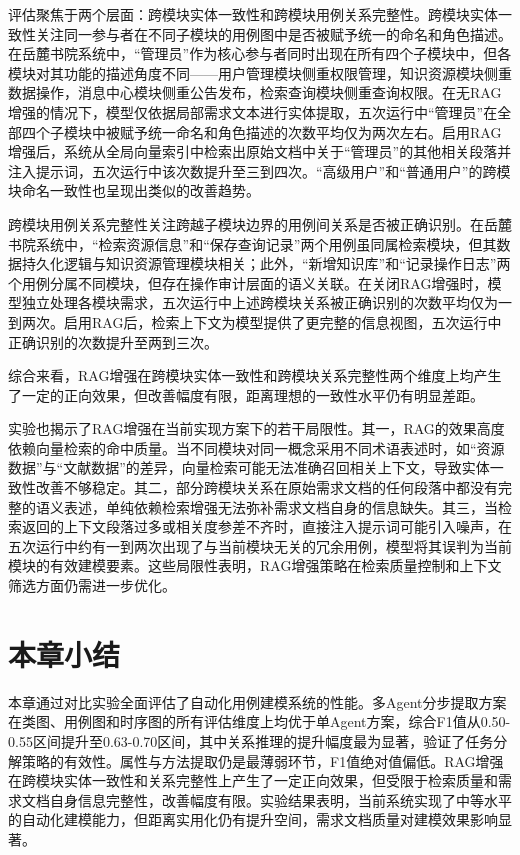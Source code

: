 评估聚焦于两个层面：跨模块实体一致性和跨模块用例关系完整性。跨模块实体一致性关注同一参与者在不同子模块的用例图中是否被赋予统一的命名和角色描述。在岳麓书院系统中，“管理员”作为核心参与者同时出现在所有四个子模块中，但各模块对其功能的描述角度不同——用户管理模块侧重权限管理，知识资源模块侧重数据操作，消息中心模块侧重公告发布，检索查询模块侧重查询权限。在无RAG增强的情况下，模型仅依据局部需求文本进行实体提取，五次运行中“管理员”在全部四个子模块中被赋予统一命名和角色描述的次数平均仅为两次左右。启用RAG增强后，系统从全局向量索引中检索出原始文档中关于“管理员”的其他相关段落并注入提示词，五次运行中该次数提升至三到四次。“高级用户”和“普通用户”的跨模块命名一致性也呈现出类似的改善趋势。

跨模块用例关系完整性关注跨越子模块边界的用例间关系是否被正确识别。在岳麓书院系统中，“检索资源信息”和“保存查询记录”两个用例虽同属检索模块，但其数据持久化逻辑与知识资源管理模块相关；此外，“新增知识库”和“记录操作日志”两个用例分属不同模块，但存在操作审计层面的语义关联。在关闭RAG增强时，模型独立处理各模块需求，五次运行中上述跨模块关系被正确识别的次数平均仅为一到两次。启用RAG后，检索上下文为模型提供了更完整的信息视图，五次运行中正确识别的次数提升至两到三次。

综合来看，RAG增强在跨模块实体一致性和跨模块关系完整性两个维度上均产生了一定的正向效果，但改善幅度有限，距离理想的一致性水平仍有明显差距。

实验也揭示了RAG增强在当前实现方案下的若干局限性。其一，RAG的效果高度依赖向量检索的命中质量。当不同模块对同一概念采用不同术语表述时，如“资源数据”与“文献数据”的差异，向量检索可能无法准确召回相关上下文，导致实体一致性改善不够稳定。其二，部分跨模块关系在原始需求文档的任何段落中都没有完整的语义表述，单纯依赖检索增强无法弥补需求文档自身的信息缺失。其三，当检索返回的上下文段落过多或相关度参差不齐时，直接注入提示词可能引入噪声，在五次运行中约有一到两次出现了与当前模块无关的冗余用例，模型将其误判为当前模块的有效建模要素。这些局限性表明，RAG增强策略在检索质量控制和上下文筛选方面仍需进一步优化。

\section{本章小结}

本章通过对比实验全面评估了自动化用例建模系统的性能。多Agent分步提取方案在类图、用例图和时序图的所有评估维度上均优于单Agent方案，综合F1值从0.50-0.55区间提升至0.63-0.70区间，其中关系推理的提升幅度最为显著，验证了任务分解策略的有效性。属性与方法提取仍是最薄弱环节，F1值绝对值偏低。RAG增强在跨模块实体一致性和关系完整性上产生了一定正向效果，但受限于检索质量和需求文档自身信息完整性，改善幅度有限。实验结果表明，当前系统实现了中等水平的自动化建模能力，但距离实用化仍有提升空间，需求文档质量对建模效果影响显著。
